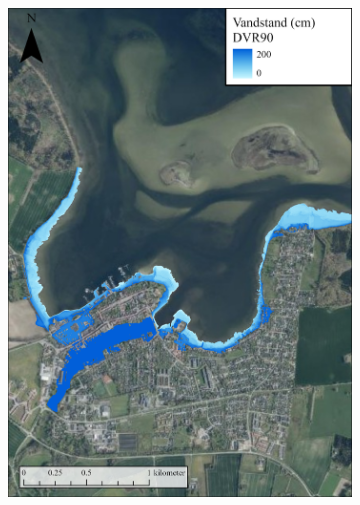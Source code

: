 \begin{figure}[H]
    \begin{subfigure}[t]{0.5\textwidth}
        \centering
        \includegraphics[width=0.95\linewidth]{images/Resultater/2023Malt/2023 resultat_praestoe.jpg}
        \caption{}
        \label{Subfig: Målt Præstø}
    \end{subfigure}
    \begin{subfigure}[t]{0.5\textwidth}
        \centering

\end{subfigure}
\end{figure}
